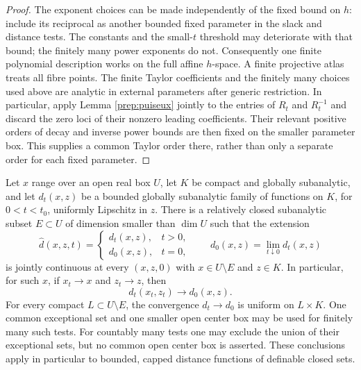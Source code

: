 \begin{proof}
The exponent choices can be made independently of the fixed bound
on $h$: include its reciprocal as another bounded fixed parameter
in the slack and distance tests. The constants and the small-$t$
threshold may deteriorate with that bound; the finitely many power
exponents do not. Consequently one finite polynomial description
works on the full affine $h$-space. A finite projective atlas treats
all fibre points. The finite Taylor coefficients and the finitely
many choices used above are analytic in external parameters after
generic restriction. In particular, apply Lemma \ref{prep:puiseux}
jointly to the entries of $R_t$ and $R_t^{-1}$ and discard the zero
loci of their nonzero leading coefficients. Their relevant positive
orders of decay and inverse power bounds are then fixed on the
smaller parameter box. This supplies a common Taylor order there,
rather than only a separate order for each fixed parameter.
\end{proof}

\begin{lemma}
\label{prep:generic-distance-convergence}
Let $x$ range over an open real box $U$, let $K$ be compact and globally
subanalytic, and let
$d_t(x,z)$ be a bounded globally subanalytic family of functions on
$K$, for $0<t<t_0$, uniformly Lipschitz in $z$. There is a relatively closed
subanalytic subset $E\subset U$ of dimension smaller than $\dim U$
such that the extension
\[
 \widehat d(x,z,t)=
 \begin{cases}
 d_t(x,z),&t>0,\\
 d_0(x,z),&t=0,
 \end{cases}
 \qquad d_0(x,z)=\lim_{t\downarrow0}d_t(x,z)
\]
is jointly continuous at every $(x,z,0)$ with $x\in U\setminus E$
and $z\in K$. In particular, for such $x$, if $x_t\to x$ and
$z_t\to z$, then
\[
 d_t(x_t,z_t)\longrightarrow d_0(x,z).
\]
For every compact $L\subset U\setminus E$, the convergence
$d_t\to d_0$ is uniform on $L\times K$. One common exceptional
set and one smaller open center box may be used for finitely many
such tests. For countably many tests one may exclude the union of
their exceptional sets, but no common open center box is asserted.
These conclusions apply in particular to bounded, capped distance
functions of definable closed sets.
\end{lemma}

